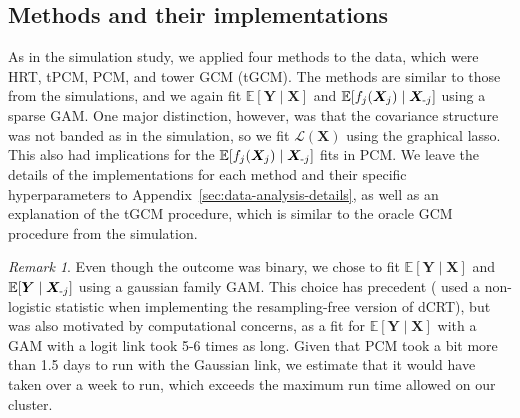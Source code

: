\documentclass[12pt]{article}
\theoremstyle{definition}
\theoremstyle{remark}
\newtheorem{remark}{Remark}
\newcommand{\E}{\mathbb E}								%
\newcommand{\prx}{\bm X}								%
\newcommand{\pry}{{\bm Y}}								%
\newcommand{\minus}{\textnormal{-}} 						    %
\begin{document}
\subsection{Methods and their implementations}

As in the simulation study, we applied four methods to the data, which were HRT, tPCM, PCM, and tower GCM (tGCM). The methods are similar to those from the simulations, and we again fit $\E[\pry \mid \prx]$ and $\E[f_j(\prx_j) \mid \prx_{\minus j}]$ using a sparse GAM. One major distinction, however, was that the covariance structure was not banded as in the simulation, so we fit $\mathcal{L}(\prx)$ using the graphical lasso. This also had implications for the $\E[f_j(\prx_j) \mid \prx_{\minus j}]$ fits in PCM. We leave the details of the implementations for each method and their specific hyperparameters to Appendix~\ref{sec:data-analysis-details}, as well as an explanation of the tGCM procedure, which is similar to the oracle GCM procedure from the simulation.

\begin{remark}
Even though the outcome was binary, we chose to fit $\E[\pry \mid \prx]$ and $\E[\pry \mid \prx_{\minus j}]$ using a gaussian family GAM. This choice has precedent (\citet{Liu2020} used a non-logistic statistic when implementing the resampling-free version of dCRT), but was also motivated by computational concerns, as a fit for $\E[\pry \mid \prx]$ with a GAM with a logit link took 5-6 times as long. Given that PCM took a bit more than 1.5 days to run with the Gaussian link, we estimate that it would have taken over a week to run, which exceeds the maximum run time allowed on our cluster. 
\end{remark}
\end{document}
